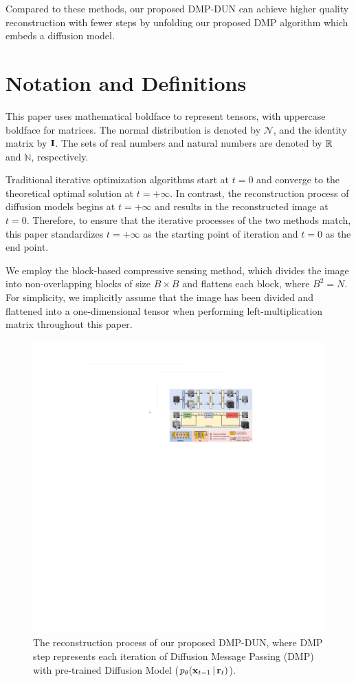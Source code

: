\documentclass[10pt,twocolumn,letterpaper]{article}
\begin{document}
Compared to these methods, our proposed DMP-DUN can achieve higher quality reconstruction with fewer steps by unfolding our proposed DMP algorithm which embeds a diffusion model.

\section{Notation and Definitions} \label{sec:Notation}
This paper uses mathematical boldface to represent tensors, with uppercase boldface for matrices. The normal distribution is denoted by $\mathcal{N}$, and the identity matrix by $\operatorname{\mathbf{I}}$. The sets of real numbers and natural numbers are denoted by $\operatorname{\mathbb{R}}$ and $\mathbb{N}$, respectively.
	
Traditional iterative optimization algorithms start at $t=0$ and converge to the theoretical optimal solution at $t=+\infty$. In contrast, the reconstruction process of diffusion models begins at $t=+\infty$ and results in the reconstructed image at $t=0$. Therefore, to ensure that the iterative processes of the two methods match, this paper standardizes $t=+\infty$ as the starting point of iteration and $t=0$ as the end point.
	
We employ the block-based compressive sensing method\cite{trevisi2019compressive, zhang2014group}, which divides the image into non-overlapping blocks of size $B \times B$ and flattens each block, where $B^2 = N$. For simplicity, we implicitly assume that the image has been divided and flattened into a one-dimensional tensor when performing left-multiplication matrix throughout this paper.

\begin{figure}[t]
	\centering
	\includegraphics[width=\linewidth]{Network_Summary_Detail.pdf}
	\caption{The reconstruction process of our proposed DMP-DUN, where DMP step represents each iteration of Diffusion Message Passing (DMP) with pre-trained Diffusion Model (\ie $p_\theta(\operatorname{\mathbf{x}}_{t-1}|\operatorname{\mathbf{r}}_t)$).}
	\label{fig:network_summary_detail}
\end{figure}
\end{document}
